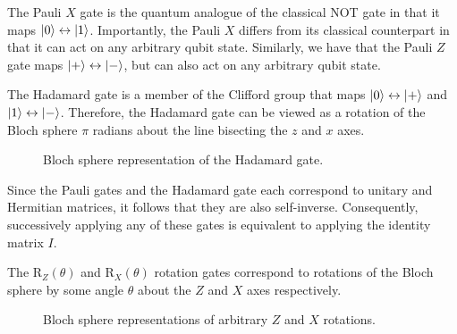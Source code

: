 The Pauli $X$ gate is the quantum analogue of the classical NOT gate in that it maps $\ket 0 \leftrightarrow \ket 1$. Importantly, the Pauli $X$ differs from its classical counterpart in that it can act on any arbitrary qubit state. Similarly, we have that the Pauli $Z$ gate maps $\ket + \leftrightarrow \ket -$, but can also act on any arbitrary qubit state.

The Hadamard gate is a member of the Clifford group that maps $\ket 0 \leftrightarrow \ket +$ and $\ket 1 \leftrightarrow \ket -$. Therefore, the Hadamard gate can be viewed as a rotation of the Bloch sphere $\pi$ radians about the line bisecting the $z$ and $x$ axes.

\begin{figure}[H]
    \centering
    \caption{Bloch sphere representation of the Hadamard gate.}
    \label{hadamard-definition}
\end{figure}

Since the Pauli gates and the Hadamard gate each correspond to unitary and Hermitian matrices, it follows that they are also self-inverse. Consequently, successively applying any of these gates is equivalent to applying the identity matrix $I$.

The R$_Z(\theta)$ and R$_X(\theta)$ rotation gates correspond to rotations of the Bloch sphere by some angle $\theta$ about the $Z$ and $X$ axes respectively.

\begin{figure}[H]
    \centering
    \begin{minipage}{0.45\textwidth}
        \centering
    \end{minipage}
    \begin{minipage}{0.45\textwidth}
        \centering
    \end{minipage}
    \caption{Bloch sphere representations of arbitrary $Z$ and $X$ rotations.}
    \label{z-rotation-definition}
    \label{x-rotation-definition}
\end{figure}

